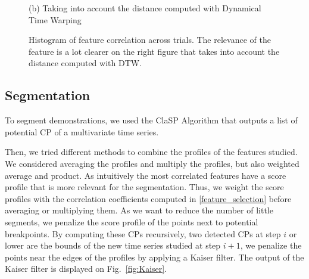 \documentclass[conference]{IEEEtran}
\begin{document}
\begin{figure}[t]
\begin{minipage}[b]{0.47\linewidth}
    \caption*{(b) Taking into account the  distance computed with Dynamical Time Warping}
  \end{minipage}

\caption{Histogram of feature correlation across trials. The relevance of the feature is a lot clearer on the right figure that takes into account the distance computed with DTW.}
  \label{fig:histcorr}
\end{figure}


\subsection{Segmentation} \label{method_segmentation}

To segment demonstrations, we used the  ClaSP Algorithm that outputs a list  of potential CP of a multivariate time series. 

Then, we tried different methods to combine the profiles of the features studied. We considered averaging the profiles and multiply the profiles, but also weighted average and product. As intuitively the most correlated features have a score profile that is more relevant for the segmentation. Thus, we weight the score profiles with the correlation coefficients computed in \ref{feature_selection} before averaging or multiplying them. As we want to reduce the number of little segments, we penalize the score profile of the points next to potential breakpoints. By computing these CPs recursively, two detected CPs at step $i$ or lower are the bounds of the new time series studied at step $i+1$, we penalize the points near the edges of the profiles by applying a Kaiser filter. The output of the Kaiser filter is displayed on Fig.~\ref{fig:Kaiser}.
\end{document}
